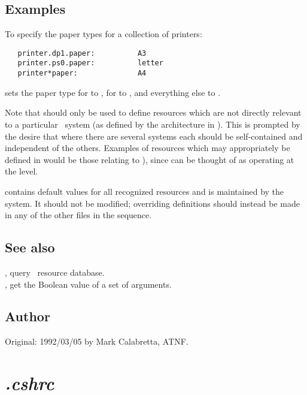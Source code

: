 \subsection*{Examples}

To specify the paper types for a collection of printers:

\begin{verbatim}
   printer.dp1.paper:          A3
   printer.ps0.paper:          letter
   printer*paper:              A4
\end{verbatim}

\noindent
sets the paper type for  to , for  to
, and everything else to .

Note that  should only be used to define resources
which are not directly relevant to a particular \aipspp\ system (as defined by
the architecture in ).  This is prompted by the desire that
where there are several systems each should be self-contained and independent
of the others.  Examples of resources which may appropriately be defined in
 would be those relating to ), since
 can be thought of as operating at the 
level.

 contains default values for all recognized resources
and is maintained by the system.  It should not be modified; overriding
definitions should instead be made in any of the other  files in
the sequence.

\subsection*{See also}

, query \aipspp\ resource database.\\
, get the Boolean value of a set of arguments.\\

\subsection*{Author}

Original: 1992/03/05 by Mark Calabretta, ATNF.


\newpage
\section{\textit{.cshrc}}
\label{.cshrc}

